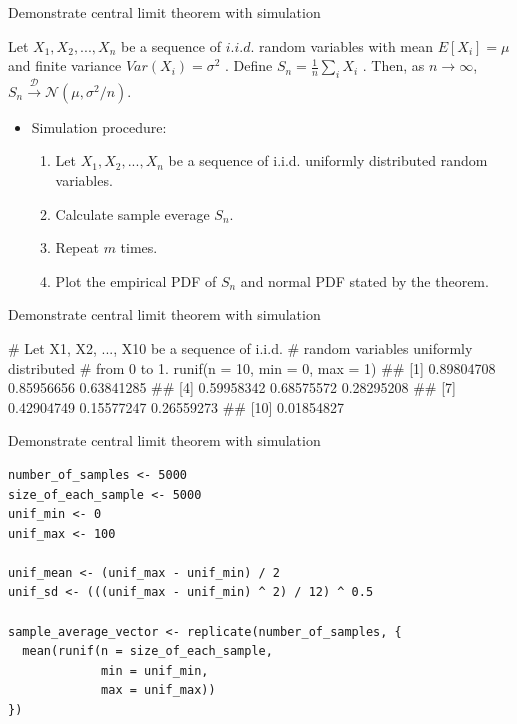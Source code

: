 \documentclass[12pt, t, xcolor=dvipsnames]{beamer}
\begin{document}
\begin{frame}{Demonstrate central limit theorem with simulation}
\begin{Theorem}

Let ${X_1, X_2, ..., X_n}$ be a sequence of $i.i.d.$ random variables with mean $E \left[{X_i}\right] = \mu$ and finite variance $Var \left({X_i}\right) = \sigma^2$ . 
Define $\displaystyle S_n = \frac{1}{n} \sum_i X_i$ . Then, as $n \to \infty$, $\displaystyle S_n \xrightarrow {\mathcal{D}} \mathcal{N} \left({\mu,\sigma^2/n}\right).$

\end{Theorem}

\begin{itemize}
  \item Simulation procedure:
  \begin{enumerate}
    \item Let ${X_1, X_2, ..., X_n}$ be a sequence of i.i.d. uniformly distributed random variables.
    \item Calculate sample everage $S_n$. 
    \item Repeat $m$ times. 
    \item Plot the empirical PDF of $S_n$ and normal PDF stated by the theorem. 
  \end{enumerate}
\end{itemize}

\end{frame}

\begin{frame}[fragile]{Demonstrate central limit theorem with simulation}

\begin{Rcode}
# Let X1, X2, ..., X10 be a sequence of i.i.d. 
# random variables uniformly distributed 
# from 0 to 1.
runif(n = 10, min = 0, max = 1)
##  [1]  0.89804708 0.85956656 0.63841285 
##  [4]  0.59958342 0.68575572 0.28295208
##  [7]  0.42904749 0.15577247 0.26559273
##  [10] 0.01854827
\end{Rcode}

\end{frame}


\begin{frame}[fragile]{Demonstrate central limit theorem with simulation}

\begin{verbatim}
number_of_samples <- 5000
size_of_each_sample <- 5000
unif_min <- 0
unif_max <- 100

unif_mean <- (unif_max - unif_min) / 2
unif_sd <- (((unif_max - unif_min) ^ 2) / 12) ^ 0.5

sample_average_vector <- replicate(number_of_samples, {
  mean(runif(n = size_of_each_sample, 
             min = unif_min, 
             max = unif_max))
})
\end{verbatim}
\end{frame}
\end{document}

